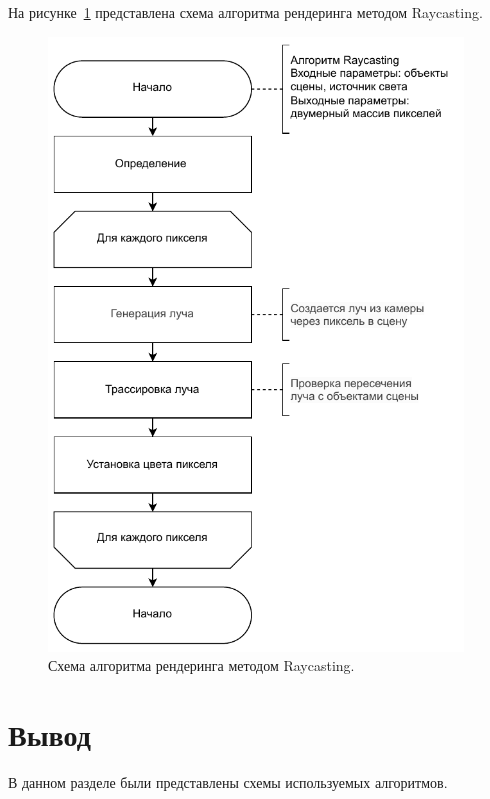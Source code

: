 \vspace{2cm}
На рисунке~\ref{images:Raycasting} представлена схема алгоритма рендеринга методом Raycasting.

\begin{figure}[H]
    \centering
    \includegraphics[width=110mm]{images/Raycasting}
    \caption{Схема алгоритма рендеринга методом Raycasting.}
    \label{images:Raycasting}
\end{figure}

\section{Вывод}

В данном разделе были представлены схемы используемых алгоритмов.